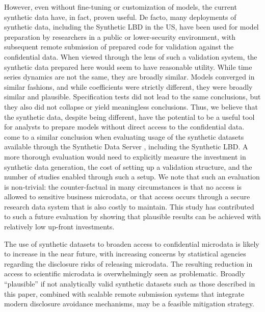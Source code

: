 \documentclass[10pt,twoside]{article}
\begin{document}
However, even without  fine-tuning or customization of models, the current synthetic data have, in fact, proven useful. De facto, many deployments of synthetic data, including the Synthetic LBD in the US, have been used for model preparation by researchers in a public or lower-security environment, with subsequent remote submission of prepared code for validation against the confidential data. When viewed through the lens of such a validation system, the synthetic data prepared here would seem to have reasonable utility. While time series dynamics are not the same, they are broadly similar. Models converged in similar fashions, and while coefficients were strictly different, they were broadly similar and plausible. Specification tests did not lead to the same conclusions, but they also did not collapse or yield meaningless conclusions. Thus, we believe that the synthetic data, despite being different, have the potential to be a useful tool for analysts to prepare models without direct access to the confidential data. \textcite{VilhuberAbowd2016-SOLE,Vilhuber2019-SGP} come to a similar conclusion when evaluating usage of the synthetic datasets available through the Synthetic Data Server \citep{AbowdVilhuber2010}, including the Synthetic LBD. A more thorough evaluation would need to explicitly measure the investment in synthetic data generation, the cost of setting up a validation structure, and the number of studies enabled through such a setup. We note that such an evaluation is non-trivial: the counter-factual in many circumstances is that no access is allowed to sensitive business microdata, or that access occurs through a secure research data system that is also costly to maintain. This study has contributed to such a future evaluation by showing that plausible results can be achieved with relatively low up-front investments.
 
The use of synthetic datasets to broaden access to confidential microdata is likely to increase in the near future, with increasing concerns by statistical agencies regarding the disclosure risks of releasing microdata. The resulting reduction in access to scientific microdata is overwhelmingly seen as problematic. Broadly ``plausible'' if not analytically valid synthetic datasets such as those described in this paper, combined with scalable remote submission systems that integrate modern disclosure avoidance mechanisms, may be a feasible mitigation strategy. 
 
\end{document}
